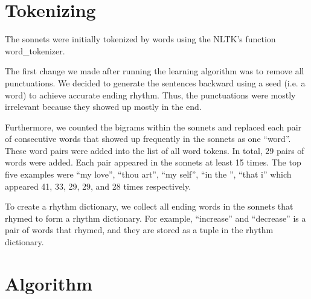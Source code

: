 \newif\ifshowsolutions
\showsolutionsfalse




\pagestyle{fancy}

\section*{Tokenizing}

\medskip

The sonnets were initially tokenized by words using the NLTK's function word_tokenizer. 

The first change we made after running the learning algorithm was to remove all punctuations. We decided to generate the sentences backward using a seed (i.e. a word) to achieve accurate ending rhythm. Thus, the punctuations were mostly irrelevant because they showed up mostly in the end.

Furthermore, we counted the bigrams within the sonnets and replaced each pair of consecutive words that showed up frequently in the sonnets as one ``word''. These word pairs were added into the list of all word tokens. In total, 29 pairs of words were added. Each pair appeared in the sonnets at least 15 times. The top five examples were ``my love'', ``thou art'', ``my self'', ``in the '', ``that i'' which appeared 41, 33, 29, 29, and 28 times respectively.

To create a rhythm dictionary, we collect all ending words in the sonnets that rhymed to form a rhythm dictionary. For example, ``increase'' and ``decrease'' is a pair of words that rhymed, and they are stored as a tuple in the rhythm dictionary.


\section*{Algorithm}

\medskip


